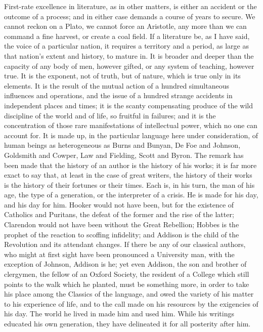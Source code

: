 First-rate excellence in literature, as in other matters, is either
an accident or the outcome of a process; and in either case demands a
course of years to secure. We cannot reckon on a Plato, we cannot
force an Aristotle, any more than we can command a fine harvest, or
create a coal field. If a literature be, as I have said, the voice of
a particular nation, it requires a territory and a period, as large as
that nation's extent and history, to mature in. It is broader and
deeper than the capacity of any body of men, however gifted, or any
system of teaching, however true. It is the exponent, not of truth,
but of nature, which is true only in its elements. It is the result of
the mutual action of a hundred simultaneous influences and operations,
and the issue of a hundred strange accidents in independent places and
times; it is the scanty compensating produce of the wild discipline of
the world and of life, so fruitful in failures; and it is the
concentration of those rare manifestations of intellectual power,
which no one can account for. It is made up, in the particular
language here under consideration, of human beings as heterogeneous as
Burns and Bunyan, De Foe and Johnson, Goldsmith and Cowper, Law and
Fielding, Scott and Byron. The remark has been made that the history
of an author is the history of his works; it is far more exact to say
that, at least in the case of great writers, the history of their
works is the history of their fortunes or their times. Each is, in his
turn, the man of his age, the type of a generation, or the interpreter
of a crisis. He is made for his day, and his day for him. Hooker would
not have been, but for the existence of Catholics and Puritans, the
defeat of the former and the rise of the latter; Clarendon would not
have been without the Great Rebellion; Hobbes is the prophet of the
reaction to scoffing infidelity; and Addison is the child of the
Revolution and its attendant changes. If there be any of our classical
authors, who might at first sight have been pronounced a University
man, with the exception of Johnson, Addison is he; yet even Addison,
the son and brother of clergymen, the fellow of an Oxford Society, the
resident of a College which still points to the walk which he planted,
must be something more, in order to take his place among the Classics
of the language, and owed the variety of his matter to his experience
of life, and to the call made on his resources by the exigencies of
his day. The world he lived in made him and used him. While his
writings educated his own generation, they have delineated it for all
posterity after him.


